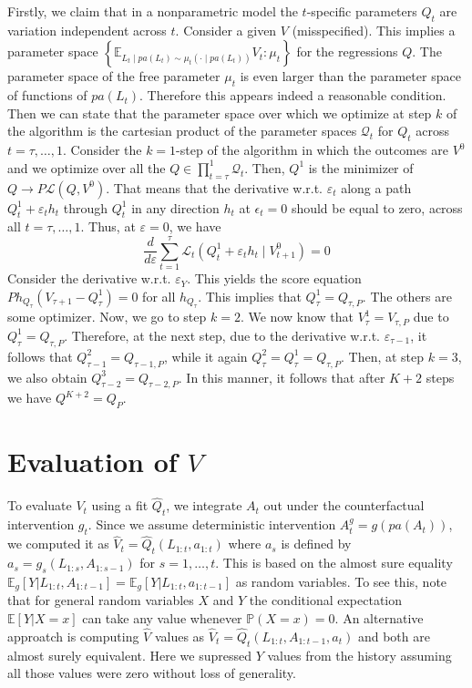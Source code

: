 \documentclass{article}
\theoremstyle{plain}
\theoremstyle{definition}
\theoremstyle{remark}
\begin{document}
Firstly, we claim that in a nonparametric model the $t$-specific parameters $Q_t$ are variation independent across $t$. Consider a given $V$ (misspecified). This implies a parameter space $\left\{\mathbb{E}_{L_t\mid pa(L_t)\sim\mu_t(\cdot\mid pa(L_t))}V_t:\mu_t\right\}$ for the regressions $Q$. The parameter space of the free parameter $\mu_t$ is even larger than the parameter space of functions of $pa(L_t)$. Therefore this appears indeed a reasonable condition. Then we can state that the parameter space over which we optimize at step $k$ of the algorithm is the cartesian product of the parameter spaces $\mathcal{Q}_t$ for $Q_t$ across $t=\tau, \ldots, 1$. Consider the $k=1$-step of the algorithm in which the outcomes are $V^0$ and we optimize over all the $Q \in \prod_{t=\tau}^1 \mathcal{Q}_t$. Then, $Q^1$ is the minimizer of $Q \rightarrow P \mathcal{L}(Q, V^0)$. That means that the derivative w.r.t. $\varepsilon_t$ along a path $Q_t^1+\varepsilon_t h_t$ through $Q_t^1$ in any direction $h_t$ at $\epsilon_t=0$ should be equal to zero, across all $t=\tau, \ldots, 1$. Thus, at $\varepsilon=0$, we have
$$
\frac{d}{d\varepsilon} \sum_{t=1}^\tau \mathcal{L}_t(Q_t^1+\varepsilon_t h_t\mid V^0_{t+1}) = 0
$$
Consider the derivative w.r.t. $\varepsilon_Y$. This yields the score equation $P h_{Q_\tau}(V_{\tau+1}-Q^1_\tau)=0$ for all $h_{Q_\tau}$. This implies that $Q^1_\tau = Q_{\tau,P}$. The others are some optimizer. Now, we go to step $k=2$. We now know that $V^1_\tau=V_{\tau, P}$ due to $Q^1_\tau=Q_{\tau, P}$. Therefore, at the next step, due to the derivative w.r.t. $\varepsilon_{\tau-1}$, it follows that $Q^2_{\tau-1}=Q_{\tau-1, P}$, while it again $Q_\tau^2=Q_\tau^1=Q_{\tau, P}$. Then, at step $k=3$, we also obtain $Q_{\tau-2}^3=Q_{\tau-2, P}$. In this manner, it follows that after $K+2$ steps we have $Q^{K+2}=Q_{P}$.

\section{Evaluation of $V$}

To evaluate $V_t$ using a fit $\hat{Q}_t$, we integrate $A_t$ out under the counterfactual intervention $g_t$. Since we assume deterministic intervention $A^g_t = g(pa(A_t))$, we computed it as $\hat{V}_t = \hat{Q}_t(L_{1:t},a_{1:t})$ where $a_s$ is defined  by $a_s=g_s(L_{1:s},A_{1:s-1})$ for $s=1,\ldots,t$. This is based on the almost sure equality $\mathbb{E}_g[Y|L_{1:t},A_{1:t-1}] = \mathbb{E}_g[Y|L_{1:t},a_{1:t-1}]$ as random variables. To see this, note that for general random variables $X$ and $Y$ the conditional expectation $\mathbb{E}[Y|X=x]$ can take any value whenever $\mathbb{P}(X=x)=0$. An alternative approatch is computing $\hat{V}$ values as $\hat{V}_t = \hat{Q}_t(L_{1:t},A_{1:t-1},a_t)$ and both are almost surely equivalent. Here we supressed $Y$ values from the history assuming all those values were zero without loss of generality.
\end{document}
